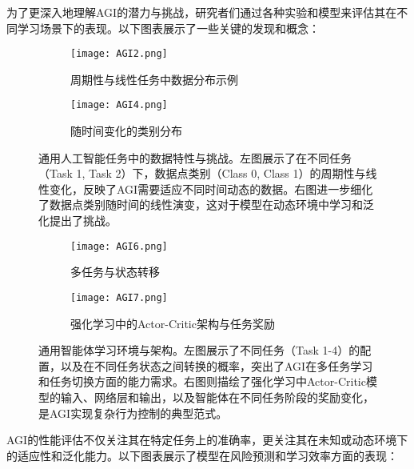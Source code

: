 为了更深入地理解AGI的潜力与挑战，研究者们通过各种实验和模型来评估其在不同学习场景下的表现。以下图表展示了一些关键的发现和概念：

\begin{figure}[H]
    \centering
    \begin{subfigure}[b]{0.49\textwidth}
        \centering
        \texttt{[image: AGI2.png]}
        \caption{周期性与线性任务中数据分布示例}
        \label{fig:agi_task_distribution}
    \end{subfigure}
    \hfill
    \begin{subfigure}[b]{0.49\textwidth}
        \centering
        \texttt{[image: AGI4.png]}
        \caption{随时间变化的类别分布}
        \label{fig:agi_time_varying_classes}
    \end{subfigure}
    \caption{通用人工智能任务中的数据特性与挑战。左图展示了在不同任务（Task 1, Task 2）下，数据点类别（Class 0, Class 1）的周期性与线性变化，反映了AGI需要适应不同时间动态的数据。右图进一步细化了数据点类别随时间的线性演变，这对于模型在动态环境中学习和泛化提出了挑战。}
    \label{fig:agi_data_characteristics}
\end{figure}

\begin{figure}[H]
    \centering
    \begin{subfigure}[b]{0.49\textwidth}
        \centering
        \texttt{[image: AGI6.png]}
        \caption{多任务与状态转移}
        \label{fig:agi_multi_task_states}
    \end{subfigure}
    \hfill
    \begin{subfigure}[b]{0.49\textwidth}
        \centering
        \texttt{[image: AGI7.png]}
        \caption{强化学习中的Actor-Critic架构与任务奖励}
        \label{fig:agi_actor_critic}
    \end{subfigure}
    \caption{通用智能体学习环境与架构。左图展示了不同任务（Task 1-4）的配置，以及在不同任务状态之间转换的概率，突出了AGI在多任务学习和任务切换方面的能力需求。右图则描绘了强化学习中Actor-Critic模型的输入、网络层和输出，以及智能体在不同任务阶段的奖励变化，是AGI实现复杂行为控制的典型范式。}
    \label{fig:agi_learning_environments_architectures}
\end{figure}

AGI的性能评估不仅关注其在特定任务上的准确率，更关注其在未知或动态环境下的适应性和泛化能力。以下图表展示了模型在风险预测和学习效率方面的表现：

